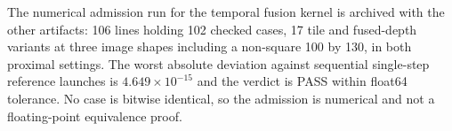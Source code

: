 The numerical admission run for the temporal fusion kernel is archived with the
other artifacts: 106 lines holding 102 checked cases, 17 tile and fused-depth
variants at three image shapes including a non-square 100 by 130, in both
proximal settings. The worst absolute deviation against sequential single-step
reference launches is $4.649 \times 10^{-15}$ and the verdict is PASS within
float64 tolerance. No case is bitwise identical, so the admission is numerical
and not a floating-point equivalence proof.
